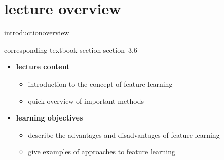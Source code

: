 

\subtitle{module 3.6: learned features}


	

    \section[overview]{lecture overview}
        \begin{frame}{introduction}{overview}
            \begin{block}{corresponding textbook section}
                    section~3.6
            \end{block}

            \begin{itemize}
                \item   \textbf{lecture content}
                    \begin{itemize}
                        \item   introduction to the concept of  feature learning
                        \item   quick overview of important methods
                   \end{itemize}
                \bigskip
                \item<2->   \textbf{learning objectives}
                    \begin{itemize}
                        \item   describe the advantages and disadvantages of feature learning
                        \item   give examples of approaches to feature learning
                    \end{itemize}
            \end{itemize}
        \end{frame}

